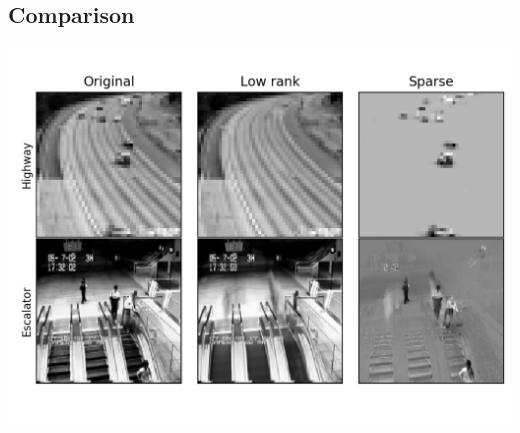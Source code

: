 \documentclass[oneside]{article}
\begin{document}
\subsection{Comparison}
\includegraphics[scale=0.5]{montage_fpcp.png}
\end{document}
